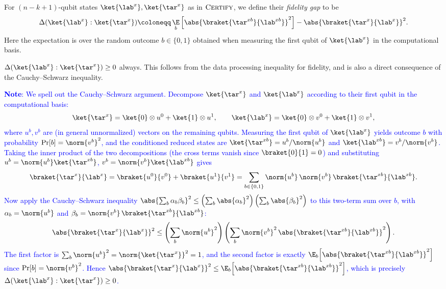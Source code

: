 \begin{definition}
    For $(n-k+1)$-qubit states $\ket{\lab^x}, \ket{\tar^x}$ as in $\textsc{Certify}$, %
    we define their \emph{fidelity gap} to be%
    \begin{equation*}
        \Delta(\ket{\lab^x}: \ket{\tar^x}) \coloneqq \mathop{\E}_{b}\left[\abs{\braket{\tar^{xb}}{\lab^{xb}}}^2\right]- \abs{\braket{\tar^x}{\lab^x}}^2.
    \end{equation*}
    Here the expectation is over the random outcome $b \in \{0,1\}$ obtained when measuring the first qubit of $\ket{\lab^x}$ in the computational basis. %
\end{definition}
\begin{remark} \label{rem:nonneg}
    $\Delta(\ket{\lab^x}: \ket{\tar^x}) \geq 0$ always. This follows from the data processing inequality for fidelity, and is also a direct consequence of the Cauchy--Schwarz inequality.
\end{remark}

\textcolor{blue}{\textbf{Note}: We spell out the Cauchy--Schwarz argument. Decompose $\ket{\tar^x}$ and $\ket{\lab^x}$ according to their first qubit in the computational basis:
\[
    \ket{\tar^x} = \ket{0}\otimes u^0 + \ket{1}\otimes u^1, \qquad \ket{\lab^x} = \ket{0}\otimes v^0 + \ket{1}\otimes v^1,
\]
where $u^b, v^b$ are (in general unnormalized) vectors on the remaining qubits. Measuring the first qubit of $\ket{\lab^x}$ yields outcome $b$ with probability $\Pr[b] = \norm{v^b}^2$, and the conditioned reduced states are $\ket{\tar^{xb}} = u^b/\norm{u^b}$ and $\ket{\lab^{xb}} = v^b/\norm{v^b}$. Taking the inner product of the two decompositions (the cross terms vanish since $\braket{0}{1} = 0$) and substituting $u^b = \norm{u^b}\ket{\tar^{xb}}$, $v^b = \norm{v^b}\ket{\lab^{xb}}$ gives
\[
    \braket{\tar^x}{\lab^x} = \braket{u^0}{v^0} + \braket{u^1}{v^1} = \sum_{b \in \{0,1\}} \norm{u^b}\,\norm{v^b}\,\braket{\tar^{xb}}{\lab^{xb}}.
\]
Now apply the Cauchy--Schwarz inequality $\abs{\sum_b \alpha_b \beta_b}^2 \leq \left(\sum_b \abs{\alpha_b}^2\right)\left(\sum_b \abs{\beta_b}^2\right)$ to this two-term sum over $b$, with $\alpha_b = \norm{u^b}$ and $\beta_b = \norm{v^b}\,\braket{\tar^{xb}}{\lab^{xb}}$:
\[
    \abs{\braket{\tar^x}{\lab^x}}^2 \leq \left(\sum_b \norm{u^b}^2\right)\left(\sum_b \norm{v^b}^2\,\abs{\braket{\tar^{xb}}{\lab^{xb}}}^2\right).
\]
The first factor is $\sum_b \norm{u^b}^2 = \norm{\ket{\tar^x}}^2 = 1$, and the second factor is exactly $\mathop{\E}_b\!\left[\abs{\braket{\tar^{xb}}{\lab^{xb}}}^2\right]$ since $\Pr[b] = \norm{v^b}^2$. Hence $\abs{\braket{\tar^x}{\lab^x}}^2 \leq \mathop{\E}_b\!\left[\abs{\braket{\tar^{xb}}{\lab^{xb}}}^2\right]$, which is precisely $\Delta(\ket{\lab^x} : \ket{\tar^x}) \geq 0$.}


